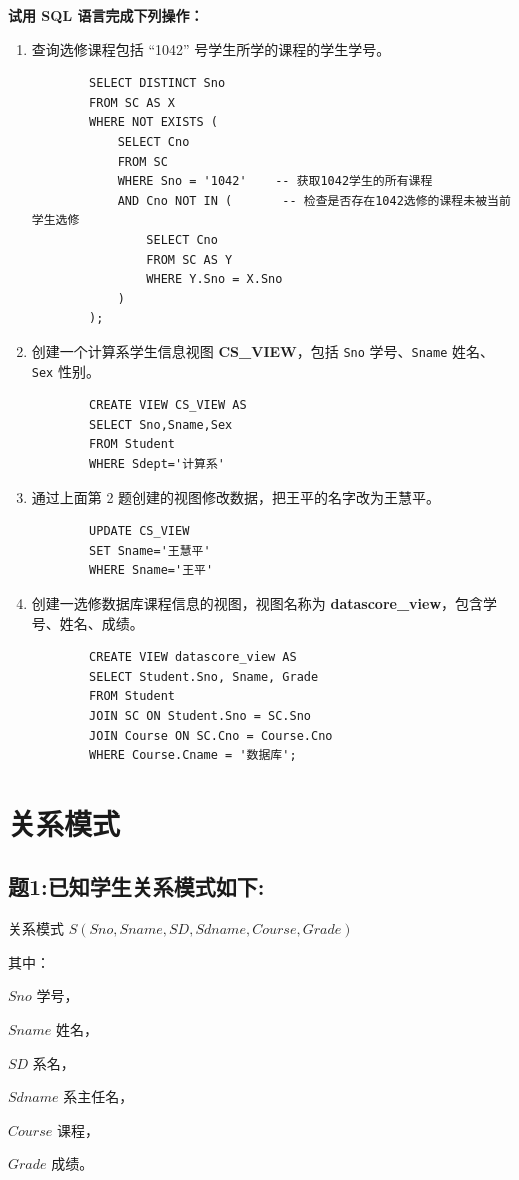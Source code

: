 \documentclass[a4paper,12pt,UTF8,fontset=none]{ctexart}
\begin{document}
\textbf{试用 SQL 语言完成下列操作：}

\begin{enumerate}
    \item 查询选修课程包括 “1042” 号学生所学的课程的学生学号。\\
    \begin{lstlisting}
        SELECT DISTINCT Sno
        FROM SC AS X
        WHERE NOT EXISTS (
            SELECT Cno
            FROM SC
            WHERE Sno = '1042'    -- 获取1042学生的所有课程
            AND Cno NOT IN (       -- 检查是否存在1042选修的课程未被当前学生选修
                SELECT Cno
                FROM SC AS Y
                WHERE Y.Sno = X.Sno
            )
        );
    \end{lstlisting}
    \item 创建一个计算系学生信息视图 \textbf{CS\_VIEW}，包括 \texttt{Sno} 学号、\texttt{Sname} 姓名、\texttt{Sex} 性别。
    \begin{lstlisting}
        CREATE VIEW CS_VIEW AS
        SELECT Sno,Sname,Sex
        FROM Student
        WHERE Sdept='计算系'
    \end{lstlisting}
    \item 通过上面第 2 题创建的视图修改数据，把王平的名字改为王慧平。
    \begin{lstlisting}
        UPDATE CS_VIEW
        SET Sname='王慧平'
        WHERE Sname='王平'
    \end{lstlisting}
    \item 创建一选修数据库课程信息的视图，视图名称为 \textbf{datascore\_view}，包含学号、姓名、成绩。
    \begin{lstlisting}
        CREATE VIEW datascore_view AS
        SELECT Student.Sno, Sname, Grade
        FROM Student
        JOIN SC ON Student.Sno = SC.Sno
        JOIN Course ON SC.Cno = Course.Cno
        WHERE Course.Cname = '数据库';
    \end{lstlisting}
\end{enumerate}

\section{关系模式}
\subsection*{题1:已知学生关系模式如下:}
\par 关系模式 $S(Sno, Sname, SD, Sdname, Course, Grade)$

其中：\par  
$Sno$ 学号，  \par
$Sname$ 姓名，  \par
$SD$ 系名，  \par
$Sdname$ 系主任名，\par
$Course$ 课程，  \par
$Grade$ 成绩。  
\end{document}
